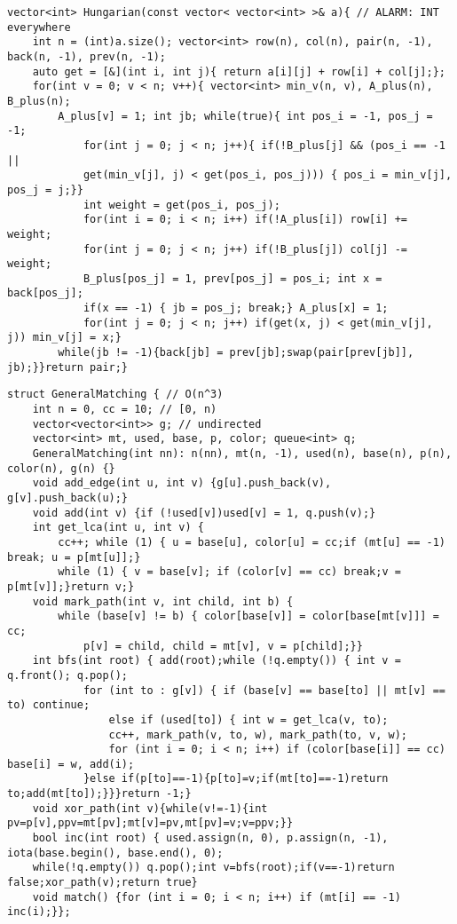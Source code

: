 \documentclass[a4paper,12pt]{article}
\begin{document}
\begin{verbatim}
vector<int> Hungarian(const vector< vector<int> >& a){ // ALARM: INT everywhere
    int n = (int)a.size(); vector<int> row(n), col(n), pair(n, -1), back(n, -1), prev(n, -1);
    auto get = [&](int i, int j){ return a[i][j] + row[i] + col[j];};
    for(int v = 0; v < n; v++){ vector<int> min_v(n, v), A_plus(n), B_plus(n);
        A_plus[v] = 1; int jb; while(true){ int pos_i = -1, pos_j = -1;
            for(int j = 0; j < n; j++){ if(!B_plus[j] && (pos_i == -1 || 
            get(min_v[j], j) < get(pos_i, pos_j))) { pos_i = min_v[j], pos_j = j;}}
            int weight = get(pos_i, pos_j);
            for(int i = 0; i < n; i++) if(!A_plus[i]) row[i] += weight;
            for(int j = 0; j < n; j++) if(!B_plus[j]) col[j] -= weight;
            B_plus[pos_j] = 1, prev[pos_j] = pos_i; int x = back[pos_j];
            if(x == -1) { jb = pos_j; break;} A_plus[x] = 1;
            for(int j = 0; j < n; j++) if(get(x, j) < get(min_v[j], j)) min_v[j] = x;}
        while(jb != -1){back[jb] = prev[jb];swap(pair[prev[jb]], jb);}}return pair;}
\end{verbatim}

\begin{verbatim}
struct GeneralMatching { // O(n^3)
    int n = 0, cc = 10; // [0, n)
    vector<vector<int>> g; // undirected
    vector<int> mt, used, base, p, color; queue<int> q;
    GeneralMatching(int nn): n(nn), mt(n, -1), used(n), base(n), p(n), color(n), g(n) {}
    void add_edge(int u, int v) {g[u].push_back(v), g[v].push_back(u);}
    void add(int v) {if (!used[v])used[v] = 1, q.push(v);}
    int get_lca(int u, int v) {
        cc++; while (1) { u = base[u], color[u] = cc;if (mt[u] == -1) break; u = p[mt[u]];}
        while (1) { v = base[v]; if (color[v] == cc) break;v = p[mt[v]];}return v;}
    void mark_path(int v, int child, int b) {
        while (base[v] != b) { color[base[v]] = color[base[mt[v]]] = cc;
            p[v] = child, child = mt[v], v = p[child];}}
    int bfs(int root) { add(root);while (!q.empty()) { int v = q.front(); q.pop();
            for (int to : g[v]) { if (base[v] == base[to] || mt[v] == to) continue;
                else if (used[to]) { int w = get_lca(v, to);
                cc++, mark_path(v, to, w), mark_path(to, v, w);
                for (int i = 0; i < n; i++) if (color[base[i]] == cc) base[i] = w, add(i);
            }else if(p[to]==-1){p[to]=v;if(mt[to]==-1)return to;add(mt[to]);}}}return -1;}
    void xor_path(int v){while(v!=-1){int pv=p[v],ppv=mt[pv];mt[v]=pv,mt[pv]=v;v=ppv;}}
    bool inc(int root) { used.assign(n, 0), p.assign(n, -1), iota(base.begin(), base.end(), 0);
    while(!q.empty()) q.pop();int v=bfs(root);if(v==-1)return false;xor_path(v);return true}
    void match() {for (int i = 0; i < n; i++) if (mt[i] == -1) inc(i);}};
\end{verbatim}
\end{document}
